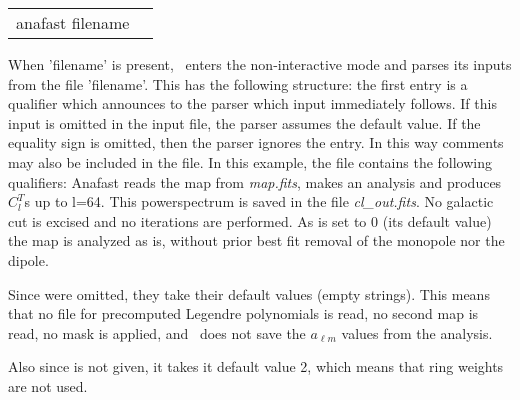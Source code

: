 \begin{examples}{2}
{%
\begin{tabular}{ll} %
anafast  filename \\
\end{tabular}%
}
{When 'filename' is present, \thedocid\ enters the non-interactive mode and parses
its inputs from the file 'filename'. This has the following
structure: the first entry is a qualifier which announces to the parser
which input immediately follows. If this input is omitted in the
input file, the parser assumes the default value.
If the equality sign is omitted, then the parser ignores the entry.
In this way comments may also be included in the file.
In this example, the file contains the following qualifiers:\hfill\newline
{}
Anafast reads the map from {\em map.fits}, makes an analysis and produces $C^T_l$s up to l=64.
This powerspectrum is saved in the file {\em cl\_out.fits}. 
No galactic cut is excised and no iterations are performed.
As %
 is set to 0 (its default value) the map is analyzed as
is, without prior best fit removal of the monopole nor the dipole.

Since\hfill\newline
{}
were omitted, they take their default values (empty strings). 
This means that no file for precomputed
Legendre polynomials is read, no second map is read, no mask is applied, and \thedocid\ does not save the $a_{\ell m}$ values
from the analysis.

Also since\hfill\newline
{}
is not given, it takes it default value 2, which means that ring
weights are not used.

}
\end{examples}


